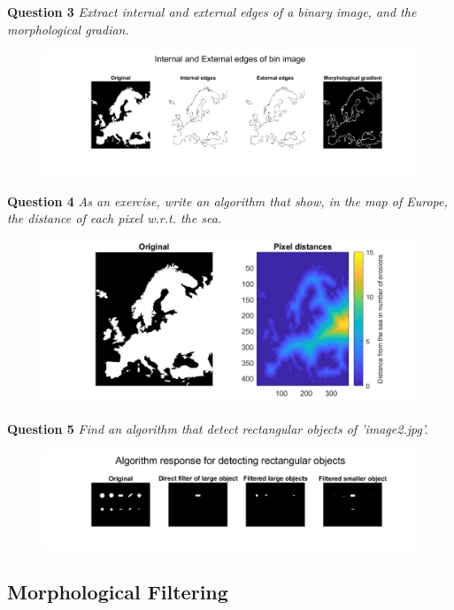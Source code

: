\newpage
\textbf{Question 3} \textit{Extract internal and external edges of a binary image, and the morphological gradian.}
\begin{figure}[h]
    \centering
    \includegraphics[width=1\linewidth]{Doc/Graphics/Part2/Part2_Question3.png}
\end{figure}


\textbf{Question 4} \textit{As an exercise, write an algorithm that show, in the map of Europe, the distance of each pixel w.r.t. the sea.}
\begin{figure}[h]
    \centering
    \includegraphics[width=0.75\linewidth]{Doc/Graphics/Part2/part2_Question4.png}
\end{figure}



\textbf{Question 5} \textit{Find an algorithm that detect rectangular objects of ’image2.jpg’.}

\begin{figure}[H]
    \centering
    \includegraphics[width=\linewidth]{Doc/Graphics/Part2/Part2_Q5.png}
\end{figure}


\subsection{Morphological Filtering}
